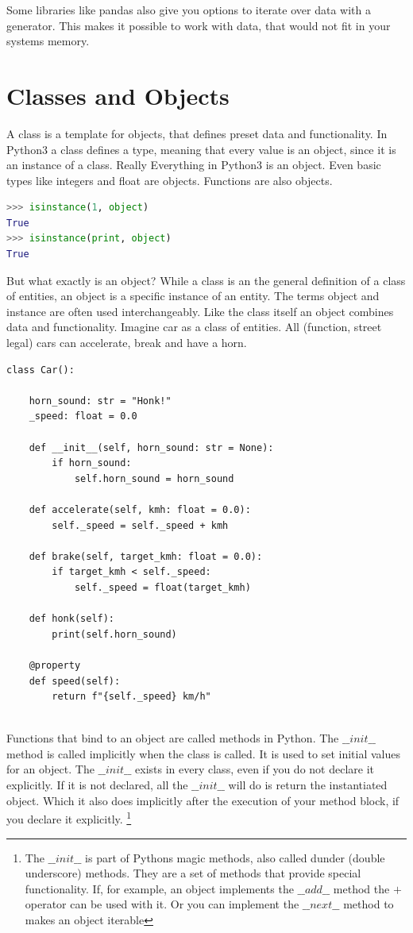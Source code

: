 \documentclass{article}
\begin{document}
Some libraries like pandas also give you options to iterate over data with a
generator.
This makes it possible to work with data, that would not fit in your
systems memory.

\section{Classes and Objects}

A class is a template for objects, that defines preset data and functionality.
In Python3 a class defines a type, meaning that every value is an object,
since it is an instance of a class.
Really Everything in Python3 is an object.
Even basic types like integers and float are objects.
Functions are also objects.

\begin{lstlisting}[language=python]
>>> isinstance(1, object)
True
>>> isinstance(print, object)
True
\end{lstlisting}

But what exactly is an object?
While a class is an the general definition of a class of entities, an object
is a specific instance of an entity.
The terms object and instance are often used interchangeably.
Like the class itself an object combines data and functionality.
Imagine car as a class of entities.
All (function, street legal) cars can accelerate, break and have a horn.

\begin{lstlisting}
class Car():

    horn_sound: str = "Honk!"
    _speed: float = 0.0

    def __init__(self, horn_sound: str = None):
        if horn_sound:
            self.horn_sound = horn_sound

    def accelerate(self, kmh: float = 0.0):
        self._speed = self._speed + kmh

    def brake(self, target_kmh: float = 0.0):
        if target_kmh < self._speed:
            self._speed = float(target_kmh)

    def honk(self):
        print(self.horn_sound)

    @property
    def speed(self):
        return f"{self._speed} km/h"


\end{lstlisting}

Functions that bind to an object are called methods in Python.
The $\_\_init\_\_$ method is called implicitly when the class is called.
It is used to set initial values for an object.
The $\_\_init\_\_$ exists in every class, even if you do not declare it explicitly.
If it is not declared, all the $\_\_init\_\_$ will do is return the instantiated object.
Which it also does implicitly after the execution of your method block,
if you declare it explicitly.
\footnote{The $\_\_init\_\_$ is part of Pythons magic methods,
    also called dunder (double underscore) methods.
    They are a set of methods that provide special functionality.
    If, for example, an object implements the $\_\_add\_\_$ method the $+$ operator
    can be used with it.
    Or you can implement the $\_\_next\_\_$ method to makes an object iterable}
\end{document}
